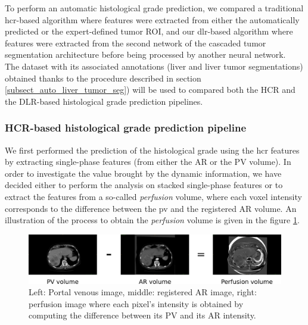 To perform an automatic histological grade prediction, we compared a traditional \ac{hcr}-based algorithm where features were extracted from either the automatically predicted or the expert-defined tumor ROI, and our \ac{dlr}-based algorithm where features were extracted from the second network of the cascaded tumor segmentation architecture before being processed by another neural network.\\
The \textbf{} dataset with its associated annotations (liver and liver tumor segmentations) obtained thanks to the procedure described in section \ref{subsect_auto_liver_tumor_seg}) will be used to compared both the HCR and the DLR-based histological grade prediction pipelines.


\subsubsection{HCR-based histological grade prediction pipeline}\label{hcr-based_method}

We first performed the prediction of the histological grade using the \ac{hcr} features by extracting single-phase features (from either the AR or the PV volume).
In order to investigate the value brought by the dynamic information, we have decided either to perform the analysis on stacked single-phase features or to extract the features from a so-called \textit{perfusion} volume, where each voxel intensity corresponds to the difference between the \ac{pv} and the registered AR volume. An illustration of the process to obtain the \textit{perfusion} volume is given in the figure \ref{fig:perfusion}.

\begin{figure}
	\centering
	\includegraphics[width=0.9\linewidth]{../Contributions/images/perfusion}
	\caption{Left: Portal venous image, middle: registered AR image, right: perfusion image where each pixel's intensity is obtained by computing the difference between its PV and its AR intensity.}
	\label{fig:perfusion}
\end{figure}

